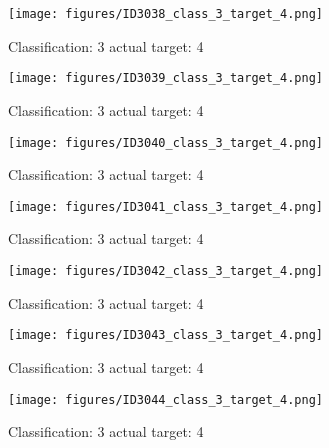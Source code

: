 \begin{figure}[h!]
\begin{center}
\texttt{[image: figures/ID3038\_class\_3\_target\_4.png]}
\end{center}
\caption{ Classification: 3 actual target: 4}
\label{fig:ID3038_class_3_target_4}
\end{figure}
\begin{figure}[h!]
\begin{center}
\texttt{[image: figures/ID3039\_class\_3\_target\_4.png]}
\end{center}
\caption{ Classification: 3 actual target: 4}
\label{fig:ID3039_class_3_target_4}
\end{figure}
\begin{figure}[h!]
\begin{center}
\texttt{[image: figures/ID3040\_class\_3\_target\_4.png]}
\end{center}
\caption{ Classification: 3 actual target: 4}
\label{fig:ID3040_class_3_target_4}
\end{figure}
\begin{figure}[h!]
\begin{center}
\texttt{[image: figures/ID3041\_class\_3\_target\_4.png]}
\end{center}
\caption{ Classification: 3 actual target: 4}
\label{fig:ID3041_class_3_target_4}
\end{figure}
\begin{figure}[h!]
\begin{center}
\texttt{[image: figures/ID3042\_class\_3\_target\_4.png]}
\end{center}
\caption{ Classification: 3 actual target: 4}
\label{fig:ID3042_class_3_target_4}
\end{figure}
\begin{figure}[h!]
\begin{center}
\texttt{[image: figures/ID3043\_class\_3\_target\_4.png]}
\end{center}
\caption{ Classification: 3 actual target: 4}
\label{fig:ID3043_class_3_target_4}
\end{figure}
\begin{figure}[h!]
\begin{center}
\texttt{[image: figures/ID3044\_class\_3\_target\_4.png]}
\end{center}
\caption{ Classification: 3 actual target: 4}
\label{fig:ID3044_class_3_target_4}
\end{figure}
